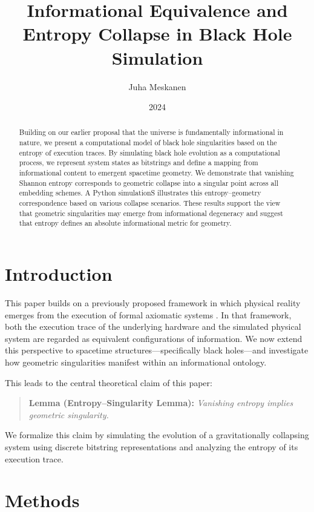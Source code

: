 \documentclass[11pt]{article}
\title{Informational Equivalence and Entropy Collapse in Black Hole Simulation}
\author{Juha Meskanen}
\date{2024}
\begin{document}
\maketitle

\begin{abstract}
  Building on our earlier proposal that the universe is fundamentally informational in nature, we present a computational model of black hole singularities based on the entropy of execution traces. By simulating black hole evolution as a computational process, we represent system states as bitstrings and define a mapping from informational content to emergent spacetime geometry. We demonstrate that vanishing Shannon entropy corresponds to geometric collapse into a singular point across all embedding schemes. A Python simulationS illustrates this entropy--geometry correspondence based on various collapse scenarios. These results support the view that geometric singularities may emerge from informational degeneracy and suggest that entropy defines an absolute informational metric for geometry.
\end{abstract}

\section{Introduction}

This paper builds on a previously proposed framework in which physical reality emerges from the execution of formal axiomatic systems \cite{meskanen2019}. In that framework, both the execution trace of the underlying hardware and the simulated physical system are regarded as equivalent configurations of information. We now extend this perspective to spacetime structures—specifically black holes—and investigate how geometric singularities manifest within an informational ontology.


This leads to the central theoretical claim of this paper:

\begin{quote}
  \textbf{Lemma (Entropy--Singularity Lemma):} \emph{Vanishing entropy implies geometric singularity.}
\end{quote}

We formalize this claim by simulating the evolution of a gravitationally collapsing system using discrete bitstring representations and analyzing the entropy of its execution trace.

\section{Methods}
\end{document}

